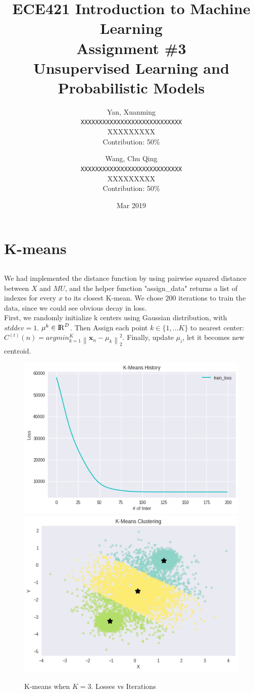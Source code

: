 \documentclass[10pt,letterpaper]{article}
\title{ECE421 Introduction to Machine Learning \\
    Assignment \#3 \\
    Unsupervised Learning and Probabilistic Models}
\date{Mar 2019}
\author{
  Yan, Xuanming\\
  \texttt{XXXXXXXXXXXXXXXXXXXXXXXXXXXX} \\
  XXXXXXXXX \\
  Contribution: 50\%
  \and
  Wang, Chu Qing\\
  \texttt{XXXXXXXXXXXXXXXXXXXXXXXXXXXX} \\
  XXXXXXXXX \\
  Contribution: 50\%
} %
\begin{document}


\maketitle %

\section{K-means}


\subsection{}
\qquad We had implemented the distance function by using pairwise squared distance between $X$ and $MU$, and the helper function "assign\_data" returns a list of indexes for every $x$ to its closest K-mean. We chose $200$ iterations to train the data, since we could see obvious decay in loss.\\

First, we randomly initialize k centers using Gaussian distribution, with $stddev = 1$. $ \mu^{k} \in {\rm I\!R}^{D} $. Then Assign each point $k \in \{1,…K\}$ to nearest center: $C^{(t)}(n) = argmin _{k = 1}^{K}\left\| \textbf{x}_n - \mu_{k} \right\|_2^2$. Finally, update $\mu_i$, let it becomes new centroid. 
\begin{figure}[H]
\centering

  \includegraphics[width=.42\linewidth]{imgs/download.png}
  \includegraphics[width=.42\linewidth]{imgs/p1_1_2.png}
  \caption{K-means when $K=3$. Losses vs Iterations}

\end{figure}
\end{document}
